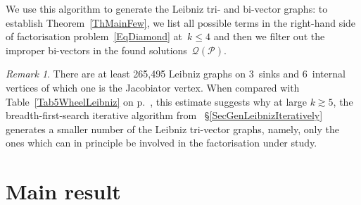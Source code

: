 \documentclass[a4paper]{jpconf}%
\theoremstyle{definition}
\theoremstyle{remark}
\newtheorem{rem}{Remark}%
\newcommand{\cP}{\mathcal{P}}\newcommand{\cR}{\mathcal{R}}
\newcommand{\cQ}{\mathcal{Q}}
\begin{document}

We use this algorithm to generate the Leibniz tri\/-{} and bi\/-\/vector graphs:
to establish Theorem~\ref{ThMainFew}, %
we list all possible terms in the right\/-\/hand side of %
factorisation problem~\eqref{EqDiamond} at~$k\leqslant 4$ and
then we filter out the improper bi\/-\/vectors in %
the found %
solutions~$\cQ(\cP)$.

\begin{rem}%
There are %
at least 265,495
Leibniz %
graphs on $3$~sinks and $6$~internal vertices of which one is the Jacobiator vertex. When compared with Table~\ref{Tab5WheelLeibniz} on p.~\pageref{Tab5WheelLeibniz}, this estimate %
suggests why at large $k\gtrsim 5$, the %
breadth\/-\/first\/-\/search iterative algorithm from~%
\S\ref{SecGenLeibnizIteratively} generates a smaller number of the Leibniz  tri\/-\/vector
graphs, namely, only the ones which can in principle be involved in the factorisation under study.
\end{rem}

\section{Main result} %
\end{document}
